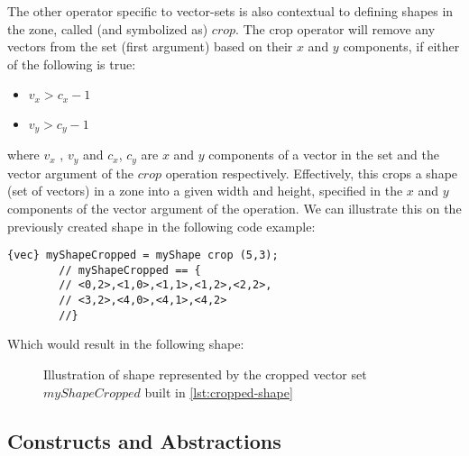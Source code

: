     \par The other operator specific to vector-sets is also contextual to defining shapes in the zone, called (and symbolized as) $crop$. The crop operator will remove any vectors from the set (first argument) based on their $x$ and $y$ components, if either of the following is true:
    \begin{itemize}
        \item $v_x > c_x - 1$
        \item $v_y > c_y - 1$
    \end{itemize}
    where $v_x$ , $v_y$ and $c_x$, $c_y$ are $x$ and $y$ components of a vector in the set and the vector argument of the $crop$ operation respectively.
    Effectively, this crops a shape (set of vectors) in a zone into a given width and height, specified in the $x$ and $y$ components of the vector argument of the operation. We can illustrate this on the previously created shape in the following code example:
    
    \begin{lstlisting}[language=aros,caption=Example of using the crop operator, label=lst:cropped-shape]
        {vec} myShapeCropped = myShape crop (5,3);
        // myShapeCropped == {
        // <0,2>,<1,0>,<1,1>,<1,2>,<2,2>,
        // <3,2>,<4,0>,<4,1>,<4,2>
        //}
    \end{lstlisting}
    
Which would result in the following shape:
    
    \begin{figure}[H]
        \centering
        \caption{Illustration of shape represented by the cropped vector set $myShapeCropped$ built in \cref{lst:cropped-shape}}
    \end{figure}

\subsection{Constructs and Abstractions}
